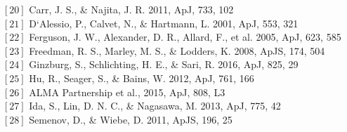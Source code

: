 \documentclass[12pt, letterpaper]{article}
\begin{document}
$[20]$ Carr, J. S., \& Najita, J. R. 2011, ApJ, 733, 102 \\
$[21]$ D`Alessio, P., Calvet, N., \& Hartmann, L. 2001, ApJ, 553, 321 \\
$[22]$ Ferguson, J. W., Alexander, D. R., Allard, F., et al. 2005, ApJ, 623, 585 \\
$[23]$ Freedman, R. S., Marley, M. S., \& Lodders, K. 2008, ApJS, 174, 504 \\
$[24]$ Ginzburg, S., Schlichting, H. E., \& Sari, R. 2016, ApJ, 825, 29 \\
$[25]$ Hu, R., Seager, S., \& Bains, W. 2012, ApJ, 761, 166 \\
$[26]$ ALMA Partnership et al., 2015, ApJ, 808, L3 \\
$[27]$ Ida, S., Lin, D. N. C., \& Nagasawa, M. 2013, ApJ, 775, 42 \\
$[28]$ Semenov, D., \& Wiebe, D. 2011, ApJS, 196, 25



\end{document}
